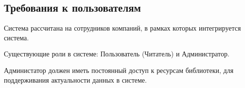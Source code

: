 \documentclass[requirements.tex]{subfiles}
\begin{document}
\subsection{Требования к пользователям}
\par
Система рассчитана на сотрудников компаний, в рамках которых интегрируется система. 
\par
Существующие роли в системе: Пользователь (Читатель) и Администратор.
\par
Администатор должен иметь постоянный доступ к ресурсам библиотеки, для поддерживания актуальности данных в системе.
\end{document}
